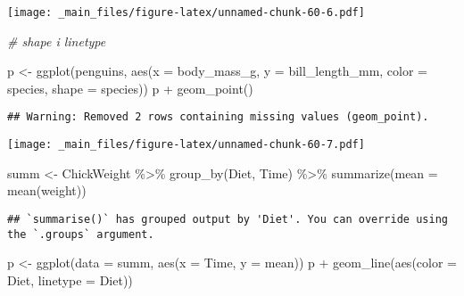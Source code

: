 \documentclass[
]{book}
\newenvironment{Shaded}{\begin{snugshade}}{\end{snugshade}}
\newcommand{\AttributeTok}[1]{\textcolor[rgb]{0.77,0.63,0.00}{#1}}
\newcommand{\CommentTok}[1]{\textcolor[rgb]{0.56,0.35,0.01}{\textit{#1}}}
\newcommand{\FunctionTok}[1]{\textcolor[rgb]{0.00,0.00,0.00}{#1}}
\newcommand{\NormalTok}[1]{#1}
\newcommand{\OtherTok}[1]{\textcolor[rgb]{0.56,0.35,0.01}{#1}}
\newcommand{\SpecialCharTok}[1]{\textcolor[rgb]{0.00,0.00,0.00}{#1}}
\begin{document}
\texttt{[image: \_main\_files/figure-latex/unnamed-chunk-60-6.pdf]}

\begin{Shaded}
\begin{Highlighting}[]
\CommentTok{\# shape i linetype}

\NormalTok{p }\OtherTok{\textless{}{-}} \FunctionTok{ggplot}\NormalTok{(penguins, }\FunctionTok{aes}\NormalTok{(}\AttributeTok{x =}\NormalTok{ body\_mass\_g, }\AttributeTok{y =}\NormalTok{ bill\_length\_mm, }\AttributeTok{color =}\NormalTok{ species, }\AttributeTok{shape =}\NormalTok{ species))}
\NormalTok{p }\SpecialCharTok{+} \FunctionTok{geom\_point}\NormalTok{()}
\end{Highlighting}
\end{Shaded}

\begin{verbatim}
## Warning: Removed 2 rows containing missing values (geom_point).
\end{verbatim}

\texttt{[image: \_main\_files/figure-latex/unnamed-chunk-60-7.pdf]}

\begin{Shaded}
\begin{Highlighting}[]
\NormalTok{summ }\OtherTok{\textless{}{-}}\NormalTok{ ChickWeight }\SpecialCharTok{\%\textgreater{}\%} \FunctionTok{group\_by}\NormalTok{(Diet, Time) }\SpecialCharTok{\%\textgreater{}\%} 
  \FunctionTok{summarize}\NormalTok{(}\AttributeTok{mean =} \FunctionTok{mean}\NormalTok{(weight))}
\end{Highlighting}
\end{Shaded}

\begin{verbatim}
## `summarise()` has grouped output by 'Diet'. You can override using the `.groups` argument.
\end{verbatim}

\begin{Shaded}
\begin{Highlighting}[]
\NormalTok{p }\OtherTok{\textless{}{-}} \FunctionTok{ggplot}\NormalTok{(}\AttributeTok{data =}\NormalTok{ summ, }\FunctionTok{aes}\NormalTok{(}\AttributeTok{x =}\NormalTok{ Time, }\AttributeTok{y =}\NormalTok{ mean))}
\NormalTok{p }\SpecialCharTok{+} \FunctionTok{geom\_line}\NormalTok{(}\FunctionTok{aes}\NormalTok{(}\AttributeTok{color =}\NormalTok{ Diet, }\AttributeTok{linetype =}\NormalTok{ Diet)) }
\end{Highlighting}
\end{Shaded}
\end{document}
